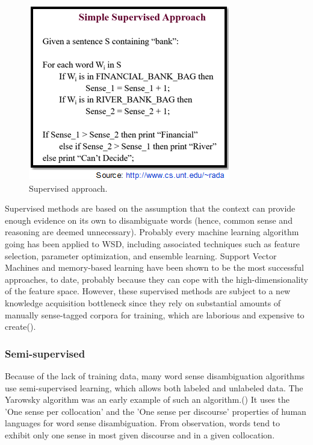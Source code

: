 \begin{figure}[tbh]
	\begin{center}
		\includegraphics[width=\columnwidth]{union(sup3)}
	\end{center}
	\caption{Supervised approach.}
\end{figure}

Supervised methods are based on the assumption that the context can provide enough evidence on its own to disambiguate words (hence, common sense and reasoning are deemed unnecessary). Probably every machine learning algorithm going has been applied to WSD, including associated techniques such as feature selection, parameter optimization, and ensemble learning. Support Vector Machines and memory-based learning have been shown to be the most successful approaches, to date, probably because they can cope with the high-dimensionality of the feature space. However, these supervised methods are subject to a new knowledge acquisition bottleneck since they rely on substantial amounts of manually sense-tagged corpora for training, which are laborious and expensive to create(\citet*{Ramos-SotoBBT14}).

\subsubsection*{Semi-supervised}
Because of the lack of training data, many word sense disambiguation algorithms use semi-supervised learning, which allows both labeled and unlabeled data. The Yarowsky algorithm was an early example of such an algorithm.(\cite{Gartner201317}) It uses the 'One sense per collocation' and the 'One sense per discourse' properties of human languages for word sense disambiguation. From observation, words tend to exhibit only one sense in most given discourse and in a given collocation.


